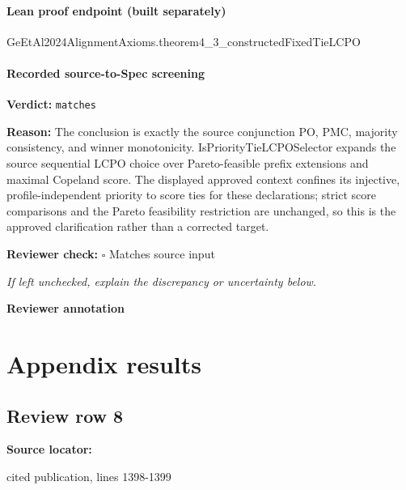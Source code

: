 \documentclass[10pt]{article}
\newcommand{\reviewerbox}{%
  \par\noindent\fbox{\parbox{0.96\linewidth}{\rule{0pt}{0.38in}}}\par
}
\newcommand{\reviewmatch}[1]{%
  \par\noindent\textbf{Reviewer check:} $\square$\; #1\par
  \noindent\emph{If left unchecked, explain the discrepancy or uncertainty below.}\par
}
\begin{document}
\paragraph{Lean proof endpoint (built separately)}\begin{ReviewVerbatim}
GeEtAl2024AlignmentAxioms.theorem4_3_constructedFixedTieLCPO
\end{ReviewVerbatim}

\paragraph{Recorded source-to-Spec screening}
\textbf{Verdict:} \texttt{matches}
\\
{\raggedright
\textbf{Reason:} The conclusion is exactly the source conjunction PO, PMC, majority consistency, and winner monotonicity.\allowbreak{}  IsPriorityTieLCPOSelector expands the source sequential LCPO choice over Pareto-\allowbreak{}feasible prefix extensions and maximal Copeland score.\allowbreak{}  The displayed approved context confines its injective, profile-\allowbreak{}independent priority to score ties for these declarations;\allowbreak{} strict score comparisons and the Pareto feasibility restriction are unchanged, so this is the approved clarification rather than a corrected target.\allowbreak{}
\par}
\reviewmatch{Matches source input}
\noindent\textbf{Reviewer annotation}\par
\reviewerbox
\clearpage
\hypertarget{source-claim-19bc4515dc72f018}{}
\hypertarget{source-section-1cf4eccafb9ce99a}{}
\section*{Appendix results}
\subsection*{Review row 8}
\textbf{Source locator:} {\footnotesize\raggedright cited publication, lines 1398-\allowbreak{}1399\par}
\end{document}
